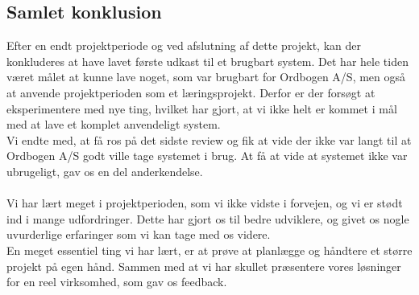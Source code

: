 \subsection{Samlet konklusion}
Efter en endt projektperiode og ved afslutning af dette projekt, kan der konkluderes at have lavet første udkast til et brugbart system.
Det har hele tiden været målet at kunne lave noget, som var brugbart for Ordbogen A/S, men også at anvende projektperioden som et læringsprojekt. 
Derfor er der forsøgt at eksperimentere med nye ting, hvilket har gjort, at vi ikke helt er kommet i mål med at lave et komplet anvendeligt system.
\\
Vi endte med, at få ros på det sidste review og fik at vide der ikke var langt til at Ordbogen A/S godt ville tage systemet i brug.
At få at vide at systemet ikke var ubrugeligt, gav os en del anderkendelse.
\\\\
Vi har lært meget i projektperioden, som vi ikke vidste i forvejen, og vi er stødt ind i mange udfordringer.
Dette har gjort os til bedre udviklere, og givet os nogle uvurderlige erfaringer som vi kan tage med os videre.
\\
En meget essentiel ting vi har lært, er at prøve at planlægge og håndtere et større projekt på egen hånd.
Sammen med at vi har skullet præsentere vores løsninger for en reel virksomhed, som gav os feedback.
